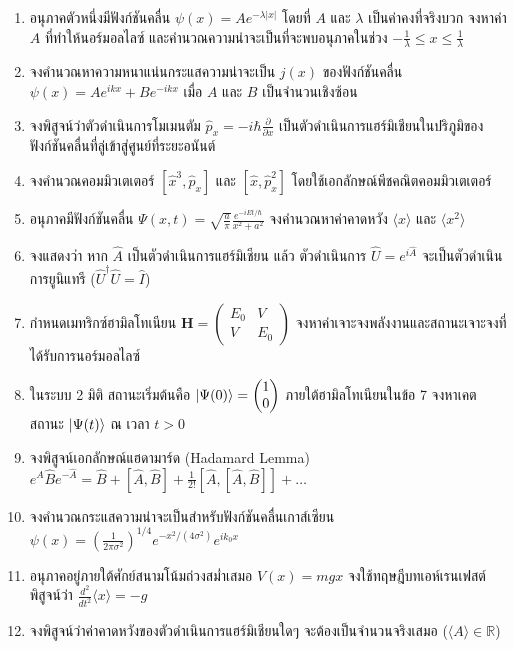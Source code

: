 \begin{enumerate}
    \item อนุภาคตัวหนึ่งมีฟังก์ชันคลื่น $\psi(x) = A e^{-\lambda |x|}$ โดยที่ $A$ และ $\lambda$ เป็นค่าคงที่จริงบวก จงหาค่า $A$ ที่ทำให้นอร์มอลไลซ์ และคำนวณความน่าจะเป็นที่จะพบอนุภาคในช่วง $-\frac{1}{\lambda} \le x \le \frac{1}{\lambda}$
    \item จงคำนวณหาความหนาแน่นกระแสความน่าจะเป็น $j(x)$ ของฟังก์ชันคลื่น $\psi(x) = A e^{i k x} + B e^{-i k x}$ เมื่อ $A$ และ $B$ เป็นจำนวนเชิงซ้อน
    \item จงพิสูจน์ว่าตัวดำเนินการโมเมนตัม $\hat{p}_x = -i\hbar\frac{\partial}{\partial x}$ เป็นตัวดำเนินการแฮร์มิเชียนในปริภูมิของฟังก์ชันคลื่นที่ลู่เข้าสู่ศูนย์ที่ระยะอนันต์
    \item จงคำนวณคอมมิวเตเตอร์ $[\hat{x}^3, \hat{p}_x]$ และ $[\hat{x}, \hat{p}_x^2]$ โดยใช้เอกลักษณ์พีชคณิตคอมมิวเตเตอร์
    \item อนุภาคมีฟังก์ชันคลื่น $\Psi(x, t) = \sqrt{\frac{a}{\pi}} \frac{e^{-iEt/\hbar}}{x^2 + a^2}$ จงคำนวณหาค่าคาดหวัง $\langle x \rangle$ และ $\langle x^2 \rangle$
    \item จงแสดงว่า หาก $\hat{A}$ เป็นตัวดำเนินการแฮร์มิเชียน แล้ว ตัวดำเนินการ $\hat{U} = e^{i\hat{A}}$ จะเป็นตัวดำเนินการยูนิแทรี ($\hat{U}^\dagger \hat{U} = \hat{I}$)
    \item กำหนดเมทริกซ์ฮามิลโทเนียน $\mathbf{H} = \begin{pmatrix} E_0 & V \\ V & E_0 \end{pmatrix}$ จงหาค่าเจาะจงพลังงานและสถานะเจาะจงที่ได้รับการนอร์มอลไลซ์
    \item ในระบบ 2 มิติ สถานะเริ่มต้นคือ $\ket{\Psi(0)} = \begin{pmatrix} 1 \\ 0 \end{pmatrix}$ ภายใต้ฮามิลโทเนียนในข้อ 7 จงหาเคตสถานะ $\ket{\Psi(t)}$ ณ เวลา $t > 0$
    \item จงพิสูจน์เอกลักษณ์แฮดามาร์ด (Hadamard Lemma) $e^{\hat{A}}\hat{B}e^{-\hat{A}} = \hat{B} + [\hat{A}, \hat{B}] + \frac{1}{2!}[\hat{A}, [\hat{A}, \hat{B}]] + \dots$
    \item จงคำนวณกระแสความน่าจะเป็นสำหรับฟังก์ชันคลื่นเกาส์เซียน $\psi(x) = \left(\frac{1}{2\pi\sigma^2}\right)^{1/4} e^{-x^2/(4\sigma^2)} e^{ik_0 x}$
    \item อนุภาคอยู่ภายใต้ศักย์สนามโน้มถ่วงสม่ำเสมอ $V(x) = mgx$ จงใช้ทฤษฎีบทเอห์เรนเฟสต์พิสูจน์ว่า $\frac{d^2}{dt^2}\langle x \rangle = -g$
    \item จงพิสูจน์ว่าค่าคาดหวังของตัวดำเนินการแฮร์มิเชียนใดๆ จะต้องเป็นจำนวนจริงเสมอ ($\langle A \rangle \in \mathbb{R}$)

\end{enumerate}
